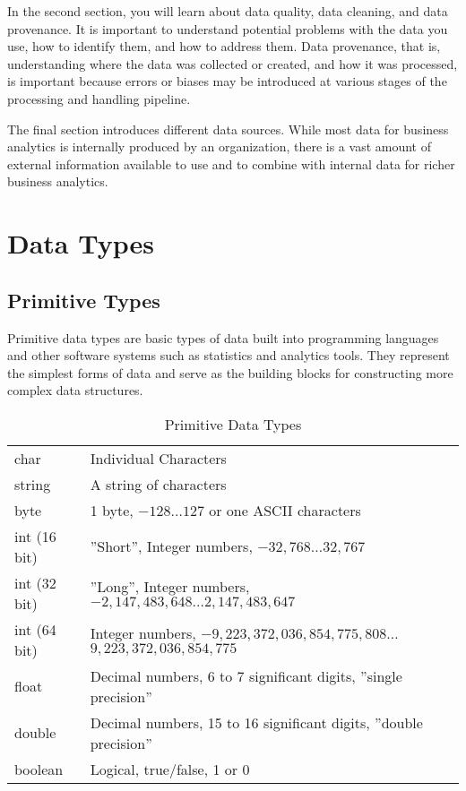 In the second section, you will learn about data quality, data cleaning, and data provenance. It is important to understand potential problems with the data you use, how to identify them, and how to address them. Data provenance, that is, understanding where the data was collected or created, and how it was processed, is important because errors or biases may be introduced at various stages of the processing and handling pipeline.

The final section introduces different data sources. While most data for business analytics is internally produced by an organization, there is a vast amount of external information available to use and to combine with internal data for richer business analytics. 

\section{Data Types}

\subsection{Primitive Types}

Primitive data types are basic types of data built into programming languages and other software systems such as statistics and analytics tools. They represent the simplest forms of data and serve as the building blocks for constructing more complex data structures.

\begin{table}
\renewcommand{\arraystretch}{1.25}

\begin{tabularx}{\textwidth}{l|X} \hline
char 			& Individual Characters\\
string			& A string of characters\\
byte			& 1 byte, $-128 \ldots 127$ or one ASCII characters \\
int (16 bit)	& ''Short'', Integer numbers, $-32,768 \ldots 32,767$ \\ 
int (32 bit)	& ''Long'', Integer numbers, $-2,147,483,648 \ldots 2,147,483,647$ \\
int (64 bit)	& Integer numbers, $-9,223,372,036,854,775,808 \ldots$ $9,223,372,036,854,775$ \\
float			& Decimal numbers, 6 to 7 significant digits, ''single precision'' \\
double			& Decimal numbers, 15 to 16 significant digits, ''double precision'' \\
boolean			& Logical, true/false, 1 or 0 \\ \hline
\end{tabularx} 
\caption{Primitive Data Types}
\label{tab:primitive}
\end{table}

